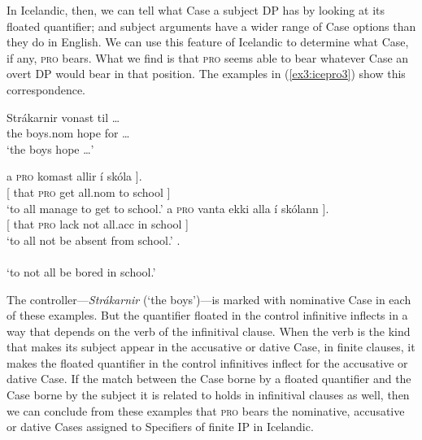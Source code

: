 In Icelandic, then, we can tell what Case a subject DP has by looking at its floated quantifier; and subject arguments have a wider range of Case options than they do in English. We can use this feature of Icelandic to determine what Case, if any, \textsc{pro} bears. What we find is that \textsc{pro} seems able to bear whatever Case an overt DP would bear in that position. The examples in (\ref{ex3:icepro3}) show this correspondence.
\begin{exe}
\ex \label{ex3:icepro3} \gll Str\'akarnir vonast til \ldots \\ {the boys.nom} hope for \ldots\\ `the boys hope \ldots'
\begin{xlist}
	\ex \gll {[\CP} a{\dh} \textsc{pro} komast allir \'i sk\'ola ]. \\ {[\CP} that \textsc{pro} get all.nom to school ]\\ `to all manage to get to school.'
	\ex \gll {[\CP} a{\dh} \textsc{pro} vanta ekki alla \'i sk\'olann ]. \\ {[\CP} that \textsc{pro} lack not all.acc in school ]\\ `to all not be absent from school.'
	\ex {}. \\ [\CP that \textsc{pro} bore not all in school ]\\ `to not all be bored in school.'
\end{xlist}
\hspace*{\fill} \citep[(8a--c): 331]{Sigurdhsson:1991}\hspace*{.5in}
\end{exe}
The controller---\emph{Str\'akarnir} (`the boys')---is marked with nominative Case in each of these examples. But the quantifier floated in the control infinitive inflects in a way that depends on the verb of the infinitival clause. When the verb is the kind that makes its subject appear in the accusative or dative Case, in finite clauses, it makes the floated quantifier in the control infinitives inflect for the accusative or dative Case. If the match between the Case borne by a floated quantifier and the Case borne by the subject it is related to holds in infinitival clauses as well, then we can conclude from these examples that \textsc{pro} bears the nominative, accusative or dative Cases assigned to Specifiers of finite IP in Icelandic.


